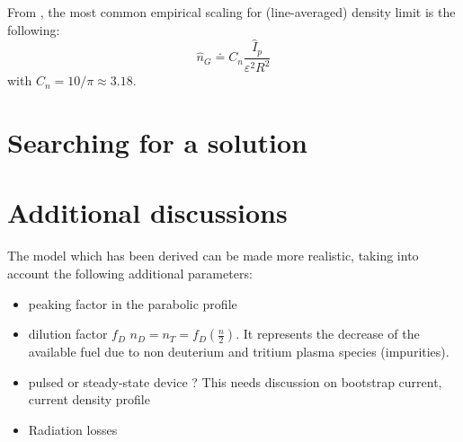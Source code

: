 From \cite[eq.(14.146)]{Freidberg2007}, the most common empirical scaling for (line-averaged) density limit is the following:
\begin{equation}
\boxed{\hat n_G \doteq C_n \frac{\hat I_p}{\varepsilon^2 R^2}  }
\label{eq:greenwald_density}
\end{equation}
with $C_n = 10/\pi \approx 3.18$.



\section{Searching for a solution}



\section{Additional discussions}
The model which has been derived can be made more realistic, taking into account the following additional parameters:
\begin{itemize}
	\item peaking factor in the parabolic profile
	\item dilution factor $f_D$ $n_D = n_T = f_D \left( \frac{n}{2} \right)$. 
	It represents the decrease of the available fuel due to non deuterium and tritium plasma species (impurities).
	\item pulsed or steady-state device ? This needs discussion on bootstrap current, current density profile
	\item Radiation losses
\end{itemize} 
